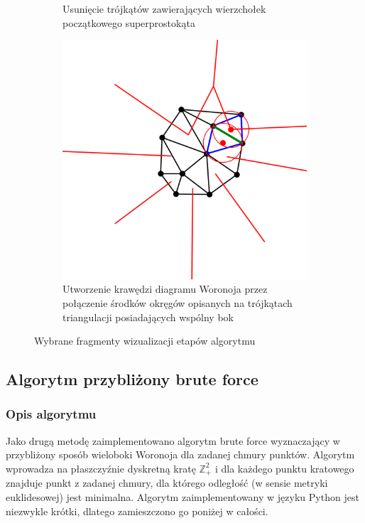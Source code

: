 \documentclass{myclass}
\begin{document}
\begin{figure}[ht]
\begin{subfigure}[b]{0.3\textwidth}
        \caption{Usunięcie trójkątów zawierających wierzchołek początkowego superprostokąta}
    \end{subfigure}
    \hfill
    \begin{subfigure}[b]{0.3\textwidth}
        \centering
        \includegraphics[width=\textwidth]{figs/visual6.png}
        \caption{Utworzenie krawędzi diagramu Woronoja przez połączenie środków okręgów opisanych na trójkątach triangulacji posiadających wspólny bok}
    \end{subfigure}

    \caption{Wybrane fragmenty wizualizacji etapów algorytmu}
    \label{fig2}
\end{figure}

\subsection{Algorytm przybliżony brute force}

\subsubsection{Opis algorytmu}

Jako drugą metodę zaimplementowano algorytm brute force wyznaczający w
przybliżony sposób wieloboki Woronoja dla zadanej chmury punktów. Algorytm
wprowadza na płaszczyźnie dyskretną kratę \(\mathbb{Z}_+^2\)  i dla każdego
punktu kratowego znajduje punkt z zadanej chmury, dla którego odległość (w
sensie metryki euklidesowej) jest minimalna. Algorytm zaimplementowany w języku
Python jest niezwykle krótki, dlatego zamieszczono go poniżej w całości.
\end{document}
